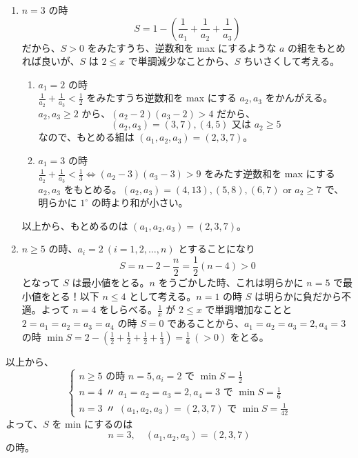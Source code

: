 \documentclass[../main.tex]{subfiles}
\begin{document}
\begin{enumerate}
  \item[(i)] $n=3$ の時
    \[
      S = 1 - \left( \frac{1}{a_1} + \frac{1}{a_2} + \frac{1}{a_3} \right)
    \]
    だから、$S > 0$ をみたすうち、逆数和を max にするような $a$ の組をもとめれば良いが、$S$ は $2 \le x$ で単調減少なことから、$S$ ちいさくして考える。

    \begin{enumerate}
      \item[$1^\circ$] $a_1 = 2$ の時\\
        $\frac{1}{a_2} + \frac{1}{a_3} < \frac{1}{2}$ をみたすうち逆数和を max にする $a_2, a_3$ をかんがえる。$a_2, a_3 \ge 2$ から、$(a_2-2)(a_3-2) > 4$ だから、
        \[
          (a_2, a_3) = (3, 7), (4, 5) \text{ 又は } a_2 \ge 5
        \]
        なので、もとめる組は $(a_1, a_2, a_3) = (2, 3, 7)$。

      \item[$2^\circ$] $a_1 = 3$ の時\\
        $\frac{1}{a_2} + \frac{1}{a_3} < \frac{1}{3} \iff (a_2-3)(a_3-3) > 9$ をみたす逆数和を max にする $a_2, a_3$ をもとめる。$(a_2, a_3) = (4, 13), (5, 8), (6, 7)$ or $a_2 \ge 7$ で、明らかに $1^\circ$ の時より和が小さい。
    \end{enumerate}
    以上から、もとめるのは $(a_1, a_2, a_3) = (2, 3, 7)$。

  \item[(ii)] $n \ge 5$ の時、$a_i = 2\ (i=1, 2, \dots, n)$ とすることになり
    \[
      S = n-2 - \frac{n}{2} = \frac{1}{2}(n-4) > 0
    \]
    となって $S$ は最小値をとる。$n$ をうごかした時、これは明らかに $n=5$ で最小値をとる！以下 $n \le 4$ として考える。$n=1$ の時 $S$ は明らかに負だから不適。よって $n=4$ をしらべる。$\frac{1}{x}$ が $2 \le x$ で単調増加なことと $2 = a_1 = a_2 = a_3 = a_4$ の時 $S=0$ であることから、$a_1 = a_2 = a_3 = 2, a_4 = 3$ の時 $\min S = 2 - \left(\frac{1}{2} + \frac{1}{2} + \frac{1}{2} + \frac{1}{3}\right) = \frac{1}{6}\ (>0)$ をとる。
\end{enumerate}

\noindent
以上から、
\[
  \begin{cases}
    n \ge 5 \text{ の時 } n=5, a_i=2 \text{ で } \min S = \frac{1}{2} \\
    n = 4 \text{ 〃 } a_1=a_2=a_3=2, a_4=3 \text{ で } \min S = \frac{1}{6} \\
    n = 3 \text{ 〃 } (a_1, a_2, a_3)=(2,3,7) \text{ で } \min S = \frac{1}{42}
  \end{cases}
\]
よって、$S$ を min にするのは
\[
  n=3, \quad (a_1, a_2, a_3) = (2, 3, 7)
\]
の時。
\end{document}
